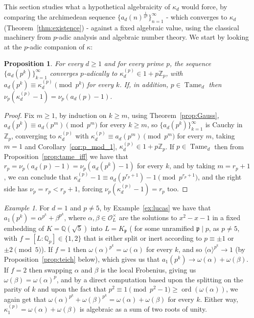 \documentclass{article}
\theoremstyle{plain}
\newtheorem{proposition}[theorem]{Proposition}
\theoremstyle{definition}
\theoremstyle{remark}
\newtheorem{example}[theorem]{Example}
\newcommand{\Q}{\mathbb{Q}}
\newcommand{\Zp}{\mathbb{Z}_p}
\newcommand{\Qp}{\mathbb{Q}_p}
\DeclareMathOperator{\Tame}{Tame}
\DeclareMathOperator{\ord}{ord}
\begin{document}
 This section studies what a hypothetical algebraicity of $\kappa_d$ would force, by comparing the archimedean sequence $\big \{a_d(n)^{\frac{1}{n^d}}\big\}_{n=1}^\infty$ - which converges to $\kappa_d$ (Theorem~\ref{thm:existence}) - against a fixed algebraic value, using the classical machinery from $p$-adic analysis and algebraic number theory. We start by looking at the $p$-adic companion of $\kappa$:

\begin{proposition}\label{prop:kappa_p_exists}
For every $d\ge1$ and for every prime $p$, the sequence $\{a_d(p^k)\}_{k=1}^\infty$ converges $p$-adically to $\kappa_d^{(p)}\in1+p\Zp$, with $a_d(p^k)\equiv\kappa_d^{(p)}\pmod{p^k}$ for every $k$. If, in addition, $p\in\Tame_d$ then $\nu_p(\kappa_d^{(p)}-1)=\nu_p(a_d(p)-1)$.
\end{proposition}
\begin{proof}
Fix $m\ge1$, by induction on $k\ge m$, using Theorem~\ref{prop:Gauss}, $a_d(p^k)\equiv a_d(p^m)\pmod{p^m}$ for every $k\ge m$, so $\{a_d(p^k)\}_{k=1}^\infty$ is Cauchy in $\Zp$, converging to $\kappa_d^{(p)}$ with $\kappa_d^{(p)}\equiv a_d(p^m)\pmod{p^m}$ for every $m$, taking $m=1$ and Corollary~\ref{cor:p_mod_1}, $\kappa_d^{(p)}\in1+p\Zp$. If $p\in\Tame_d$ then from Proposition~\ref{prop:tame_iff} we have that $r_p=\nu_p(a_d(p)-1)=\nu_p(a_d(p^k)-1)$ for every $k$, and by taking $m=r_p+1$, we can conclude that $\kappa_d^{(p)}-1\equiv a_d(p^{r_p+1})-1\pmod{p^{r_p+1}}$, and the right side has $\nu_p=r_p<r_p+1$, forcing $\nu_p(\kappa_d^{(p)}-1)=r_p$ too.
\end{proof}



\begin{example}\label{ex:A1alg}
For $d=1$ and $p\ne5$, by Example~\ref{ex:lucas} we have that $a_1(p^k)=\alpha^{p^k}+\beta^{p^k}$, where $\alpha,\beta\in\mathcal O_L^\times$ are the solutions to $x^2-x-1$ in a fixed embedding of $K=\Q(\sqrt5)$ into $L=K_\mathfrak p$ ( for some unramified $\mathfrak p\mid p$, as $p\ne5$, with $f=[L:\Qp]\in\{1,2\}$ that is either split or inert according to $p\equiv\pm1$ or $\pm2\pmod5$). If $f=1$ then  $\omega(\alpha)^{p^k}=\omega(\alpha)$ for every $k$, and so $\langle\alpha\rangle^{p^k}\to1$ (by Proposition~\ref{prop:teich} below), which gives us that $a_1(p^k)\to\omega(\alpha)+\omega(\beta)$. If $f=2$ then swapping $\alpha$ and  $\beta$ is the local Frobenius, giving us $\omega(\beta)=\omega(\alpha)^p$, and by a direct computation based upon the splitting on the parity of $k$ and upon the fact that $p^2\equiv1\pmod{p^2-1}\ge\ord(\omega(\alpha))$, we again get that $\omega(\alpha)^{p^k}+\omega(\beta)^{p^k}=\omega(\alpha)+\omega(\beta)$ for every $k$. Either way, $\kappa_1^{(p)}=\omega(\alpha)+\omega(\beta)$ is algebraic as a sum of two roots of unity.
\end{example}
\end{document}
